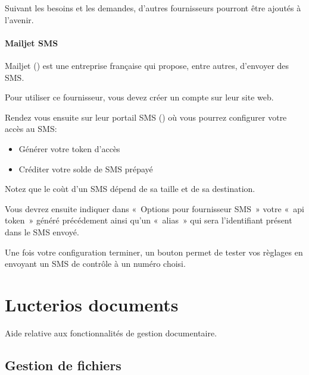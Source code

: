 \documentclass[a4paper,10pt,oneside,french]{sphinxmanual}
\begin{document}
\sphinxAtStartPar
Suivant les besoins et les demandes, d’autres fournisseurs pourront être ajoutés à l’avenir.


\subsubsection{Mailjet SMS}
\label{\detokenize{mailing/configuration:mailjet-sms}}
\sphinxAtStartPar
Mailjet () est une entreprise française qui propose, entre autres, d’envoyer des SMS.

\sphinxAtStartPar
Pour utiliser ce fournisseur, vous devez créer un compte sur leur site web.

\sphinxAtStartPar
Rendez vous ensuite sur leur portail SMS () où vous pourrez configurer votre accès au SMS:
\begin{itemize}
\item {} 
\sphinxAtStartPar
Générer votre token d’accès

\item {} 
\sphinxAtStartPar
Créditer votre solde de SMS prépayé

\end{itemize}

\sphinxAtStartPar
Notez que le coùt d’un SMS dépend de sa taille et de sa destination.

\sphinxAtStartPar
Vous devrez ensuite indiquer dans « Options pour fournisseur SMS » votre « api token » généré précédement
ainsi qu’un « alias » qui sera l’identifiant présent dans le SMS envoyé.

\sphinxAtStartPar
Une fois votre configuration terminer, un bouton  permet de tester vos règlages en envoyant un SMS de contrôle à un numéro choisi.


\chapter{Lucterios documents}
\label{\detokenize{documents/index:lucterios-documents}}\label{\detokenize{documents/index::doc}}
\sphinxAtStartPar
Aide relative aux fonctionnalités de gestion documentaire.


\section{Gestion de fichiers}
\label{\detokenize{documents/shared_document:gestion-de-fichiers}}\label{\detokenize{documents/shared_document::doc}}
\end{document}
